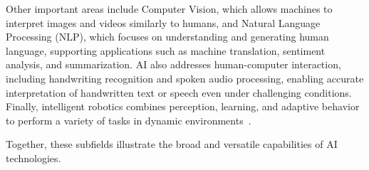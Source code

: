 Other important areas include Computer Vision, which allows machines to interpret images and videos similarly to humans, and Natural Language Processing (NLP), which focuses on understanding and generating human language, supporting applications such as machine translation, sentiment analysis, and summarization. AI also addresses human-computer interaction, including handwriting recognition and spoken audio processing, enabling accurate interpretation of handwritten text or speech even under challenging conditions. Finally, intelligent robotics combines perception, learning, and adaptive behavior to perform a variety of tasks in dynamic environments~\parencite{Bendida2025}.

Together, these subfields illustrate the broad and versatile capabilities of AI technologies.